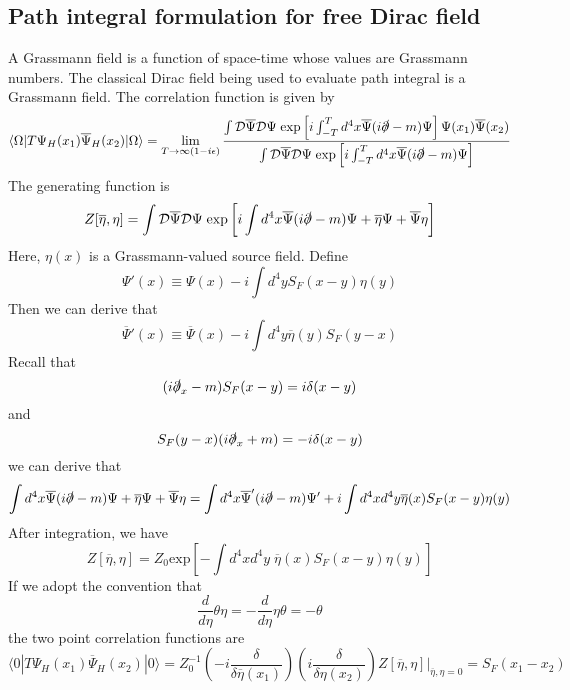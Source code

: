 \subsection{Path integral formulation for free Dirac field}
A Grassmann field is a function of space-time whose values are Grassmann numbers. The classical Dirac field being used to evaluate path integral is a Grassmann field. The correlation function is given by
\[\langle \Omega | T \Psi_H(x_1) \overline{\Psi}_H(x_2)| \Omega \rangle = \lim_{T \to \infty(1-i\epsilon)} \frac{\int \mathcal{D}\overline{\Psi} \mathcal{D}\Psi \; \mathrm{exp} \left[ i\int_{-T}^T d^4x \overline{\Psi}(i\slashed{\partial}-m)\Psi \right] \Psi(x_1) \overline{\Psi}(x_2)}{\int \mathcal{D}\overline{\Psi} \mathcal{D}\Psi \; \mathrm{exp} \left[ i\int_{-T}^T d^4x \overline{\Psi}(i\slashed{\partial}-m)\Psi \right]}\]
The generating function is 
\[Z[\overline{\eta},\eta] = \int \mathcal{D}\overline{\Psi} \mathcal{D}\Psi \; \mathrm{exp} \left[ i\int d^4x \overline{\Psi}(i\slashed{\partial}-m)\Psi + \overline{\eta}\Psi + \overline{\Psi}\eta \right]\]
Here, $\eta(x)$ is a Grassmann-valued source field. 
Define
\[\Psi'(x) \equiv \Psi(x) - i \int d^4y S_F(x-y)\eta(y)\]
Then we can derive that
\[\overline{\Psi}'(x) \equiv \overline{\Psi}(x) - i \int d^4y \overline{\eta}(y)S_F(y-x)\]
Recall that
\[(i\slashed{\partial}_x-m)S_F(x-y) = i\delta(x-y)\]
and
\[S_F(y-x)(i \slashed{\partial}_x+m) = -i\delta(x-y)\]
we can derive that
\[\int d^4x \overline{\Psi}(i\slashed{\partial}-m)\Psi + \overline{\eta}\Psi + \overline{\Psi}\eta = \int d^4x \overline{\Psi}'(i\slashed{\partial}-m)\Psi' + i \int d^4x d^4y \overline{\eta}(x)S_F(x-y)\eta(y) \]
After integration, we have
\[Z[\overline{\eta},\eta] = Z_0 \mathrm{exp} \left[ -\int d^4x d^4y \; \overline{\eta}(x)S_F(x-y)\eta(y) \right]\]
If we adopt the convention that
\[\frac{d}{d\eta} \theta \eta = - \frac{d}{d\eta} \eta \theta = - \theta\]
the two point correlation functions are
\[\langle 0 | T \Psi_H(x_1) \overline{\Psi}_H(x_2)| 0 \rangle = Z_0^{-1} \left(-i \frac{\delta}{\delta \overline{\eta}(x_1)} \right) \left(i \frac{\delta}{\delta \eta(x_2)} \right) Z[\overline{\eta},\eta]|_{\overline{\eta},\eta=0} = S_F(x_1-x_2) \]

